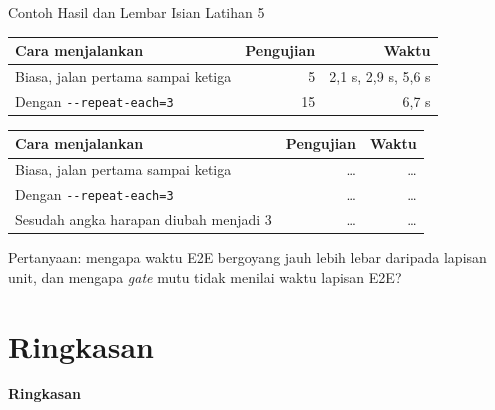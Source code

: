 \documentclass[aspectratio=169, table, 12pt]{beamer}
\begin{document}
\begin{frame}{{\Large Contoh Hasil dan Lembar Isian Latihan 5}}
  \vspace{4pt}
  \centering
  {\footnotesize
  \begin{tabularx}{\textwidth}{Yrr}
    \hline
    \textbf{Cara menjalankan} & \textbf{Pengujian} & \textbf{Waktu} \\
    \hline
    Biasa, jalan pertama sampai ketiga & 5 & 2,1 s, 2,9 s, 5,6 s \\
    \hline
    Dengan \texttt{-{}-repeat-each=3} & 15 & 6,7 s \\
    \hline
  \end{tabularx}}

  \vspace{6pt}
  \centering
  {\footnotesize
  \begin{tabularx}{\textwidth}{Yrr}
    \hline
    \textbf{Cara menjalankan} & \textbf{Pengujian} & \textbf{Waktu} \\
    \hline
    Biasa, jalan pertama sampai ketiga & \dots & \dots \\
    \hline
    Dengan \texttt{-{}-repeat-each=3} & \dots & \dots \\
    \hline
    Sesudah angka harapan diubah menjadi 3 & \dots & \dots \\
    \hline
  \end{tabularx}}

  \vspace{4pt}
  {\footnotesize Pertanyaan: mengapa waktu E2E bergoyang jauh lebih lebar
  daripada lapisan unit, dan mengapa \textit{gate} mutu tidak menilai waktu
  lapisan E2E?}
\end{frame}

\section{Ringkasan}

\begin{frame}{\hfill}
  \centering
  \Huge{\textbf{Ringkasan}}
\end{frame}
\end{document}
